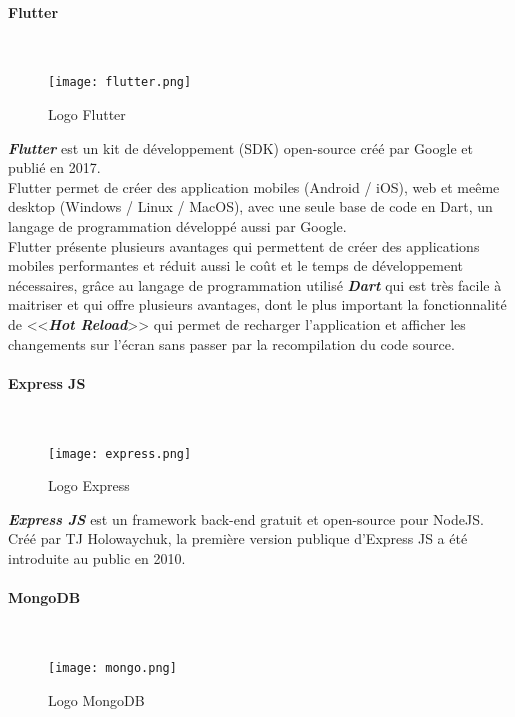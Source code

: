 \paragraph{Flutter}\mbox{} \\
\vspace{1cm}
\begin{figure}[H]
    \centering
    \texttt{[image: flutter.png]}
    \vspace{1cm}
    \caption{Logo Flutter}
    \label{fig:flutter_logo}
\end{figure}
\textit{\textbf{Flutter}} est un kit de développement (SDK) open-source créé par Google et publié en 2017.\\
\noindent Flutter permet de créer des application mobiles (Android / iOS), web et meême desktop (Windows / Linux / MacOS), avec une seule base de code en Dart, un langage de programmation développé aussi par Google. \\
\noindent Flutter présente plusieurs avantages qui permettent de créer des applications mobiles performantes et réduit aussi le coût et le temps de développement nécessaires, grâce au langage de programmation utilisé \textit{\textbf{Dart}} qui est très facile à maitriser et qui offre plusieurs avantages, dont le plus important la fonctionnalité de <<\textit{\textbf{Hot Reload}}>> qui permet de recharger l'application et afficher les changements sur l'écran sans passer par la recompilation du code source.
\paragraph{Express JS}\mbox{} \\
\vspace{1cm}
\begin{figure}[H]
    \centering
    \texttt{[image: express.png]}
    \vspace{1cm}
    \caption{Logo Express}
    \label{fig:express_logo}
\end{figure}
\textit{\textbf{Express JS}} est un framework back-end gratuit et open-source pour NodeJS.\\
\noindent Créé par TJ Holowaychuk, la première version publique d'Express JS a été introduite au public en 2010.
\paragraph{MongoDB} \mbox{} \\
\vspace{1cm}
\begin{figure}[H]
    \centering
    \texttt{[image: mongo.png]}
    \vspace{1cm}
    \caption{Logo MongoDB}
    \label{fig:mongo_logo}
\end{figure}
